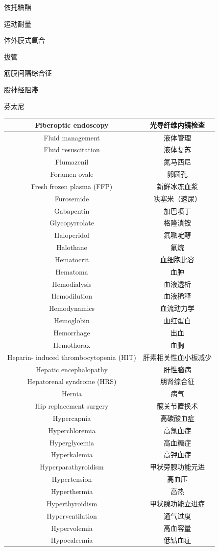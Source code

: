 \documentclass[10pt]{article}
\begin{document}
依托粬酯

运动耐量

体外膜式氧合

拔管

筋膜间隔综合征

股神经阻滞

芬太尼

\begin{center}
\begin{tabular}{|c|c|}
\hline
Fiberoptic endoscopy & 光导纤维内镜检查 \\
\hline
Fluid management & 液体管理 \\
\hline
Fluid resuscitation & 液体复苏 \\
\hline
Flumazenil & 氮马西尼 \\
\hline
Foramen ovale & 卵圆孔 \\
\hline
Fresh frozen plasma (FFP) & 新鲜冰冻血浆 \\
\hline
Furosemide & 呋塞米（速尿） \\
\hline
Gabapentin & 加巴喷丁 \\
\hline
Glycopyrrolate & 格隆溑铵 \\
\hline
Haloperidol & 氟哌啶醇 \\
\hline
Halothane & 氟烷 \\
\hline
Hematocrit & 血细胞比容 \\
\hline
Hematoma & 血肿 \\
\hline
Hemodialysis & 血液透析 \\
\hline
Hemodilution & 血液稀释 \\
\hline
Hemodynamics & 血流动力学 \\
\hline
Hemoglobin & 血红蛋白 \\
\hline
Hemorrhage & 出血 \\
\hline
Hemothorax & 血胸 \\
\hline
Heparin- induced thrombocytopenia (HIT) & 肝素相关性血小板减少 \\
\hline
Hepatic encephalopathy & 肝性脑病 \\
\hline
Hepatorenal syndrome (HRS) & 朋肾综合征 \\
\hline
Hernia & 病气 \\
\hline
Hip replacement surgery & 髋关节置换术 \\
\hline
Hypercapnia & 高碳酸血症 \\
\hline
Hyperchloremia & 高氯血症 \\
\hline
Hyperglycemia & 高血糖症 \\
\hline
Hyperkalemia & 高钾血症 \\
\hline
Hyperparathyroidism & 甲状旁腺功能元进 \\
\hline
Hypertension & 高血压 \\
\hline
Hyperthermia & 高热 \\
\hline
Hyperthyroidism & 甲状腺功能立进症 \\
\hline
Hyperventilation & 通气过度 \\
\hline
Hypervolemia & 高血容量 \\
\hline
Hypocalcemia & 低钴血症 \\
\hline
\end{tabular}
\end{center}
\end{document}
